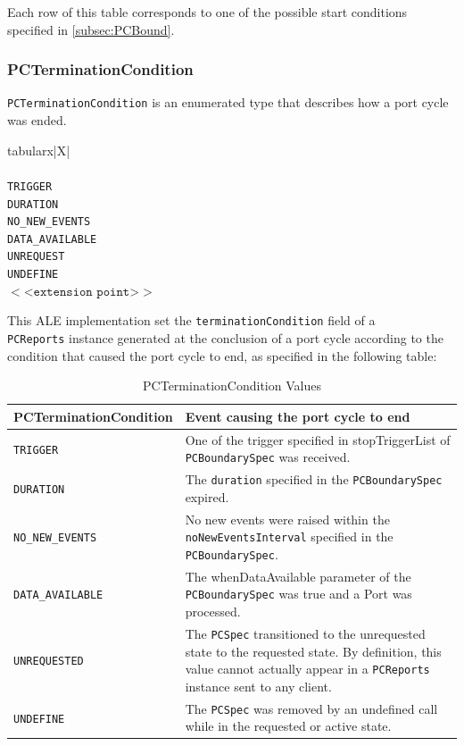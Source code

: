 \documentclass[11pt,a4paper,oneside]{article}
\newenvironment{bbox}%
{\begin{table}[h!]\begin{threeparttable}}%
{\end{threeparttable}\end{table}\FloatBarrier}
\newenvironment{bbox}
{\ifvmode\IgnorePar\fi \EndP\Tg<div class='bbox'>}{\Tg</div>\IgnoreIndent}
\begin{document}
Each row of this table corresponds to one of the possible start conditions specified in \ref{subsec:PCBound}.

\subsubsection{PCTerminationCondition}
\texttt{PCTerminationCondition} is an enumerated type that describes how a port cycle was ended.

\begin{bbox}
\begin{edtable}{tabularx}{\linewidth}{|X|}
\hline 
{}
\\
\\
\texttt{TRIGGER}\\
\texttt{DURATION}\\
\texttt{NO\_NEW\_EVENTS}\\
\texttt{DATA\_AVAILABLE}\\
\texttt{UNREQUEST}\\
\texttt{UNDEFINE}\\
$<$<$\texttt{extension point}$>$>$\\
\hline
\end{edtable}
\end{bbox}

This ALE implementation set the \texttt{terminationCondition} field of a \ifpdf\\\fi\texttt{PCReports} instance generated at the conclusion of a port cycle according to the condition that caused the port cycle to end, as specified in the following table:

\begin{table}[!h]
\begin{tabularx}{\linewidth}{|X|X|}
\hline
\textbf{PCTerminationCondition}&\textbf{Event causing the port cycle to end}\\
\hline
\texttt{TRIGGER}&One of the trigger specified in stopTriggerList  of \texttt{PCBoundarySpec} was received.\\
\hline
\texttt{DURATION}&The \texttt{duration} specified in the \texttt{PCBoundarySpec} expired.\\
\hline
\texttt{NO\_NEW\_EVENTS}&No new events were raised within the \texttt{noNewEventsInterval} specified in the \texttt{PCBoundarySpec}.\\
\hline
\texttt{DATA\_AVAILABLE}&The whenDataAvailable parameter of the \texttt{PCBoundarySpec} was true and a Port was processed.\\
\hline
\texttt{UNREQUESTED}&The \texttt{PCSpec} transitioned to the unrequested state to the requested state. By definition, this value cannot actually appear in a \texttt{PCReports} instance sent to any client.\\
\hline
\texttt{UNDEFINE}&The \texttt{PCSpec} was removed by an undefined call while in the requested or active state.\\
\hline
\end{tabularx}
\caption{PCTerminationCondition  Values}
\MakeLineNo
\end{table}
\FloatBarrier
\end{document}
